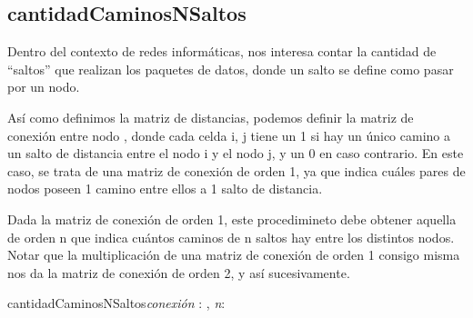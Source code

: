 \documentclass[10pt,a4paper]{article}
\begin{document}

\subsection{cantidadCaminosNSaltos}

 Dentro del contexto de redes informáticas, nos interesa contar la cantidad de “saltos” que realizan los paquetes de datos, donde un salto se define como pasar por un nodo.

Así como definimos la matriz de distancias, podemos definir la matriz de conexión entre nodo , donde cada celda i, j tiene un 1 si hay un único camino a un salto de distancia entre el nodo i y el nodo j, y un 0 en caso contrario. En este caso, se trata de una matriz de conexión de orden 1, ya que indica cuáles pares de nodos poseen 1 camino entre ellos a 1 salto de distancia.

Dada la matriz de conexión de orden 1, este procedimineto debe obtener aquella de orden n que indica cuántos caminos de n saltos hay entre los distintos nodos. Notar que la multiplicación de una matriz de conexión de orden 1 consigo misma nos da la matriz de conexión de orden 2, y así sucesivamente.

\vspace{2mm}
 
 
 

 
 
\vspace{2mm}
 
\begin{proc}{cantidadCaminosNSaltos}{\Inout \textit{conexión} : \TLista{\TLista{\ent}}, \In \textit{n}: \ent}{}
\end{proc}
\end{document}
